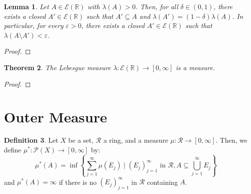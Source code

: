 \documentclass[a4paper, openany]{memoir}
\theoremstyle{definition}
\newtheorem{definition}{Definition}[section]
\theoremstyle{plain}
\newtheorem{theorem}[definition]{Theorem}
\newtheorem{lemma}[definition]{Lemma}
\begin{document}
    \begin{lemma}
        Let $A \in \mathcal{E}(\mathbb{R})$ with $\lambda(A) > 0$. Then, for all $\delta \in (0, 1)$, there exists a closed $A' \in \mathcal{E}(\mathbb{R})$ such that $A' \subseteq A$ and $\lambda(A') = (1 - \delta ) \lambda(A)$. In particular, for every $\varepsilon > 0$, there exists a closed $A' \in \mathcal{E}(\mathbb{R})$ such that $\lambda(A \setminus A') < \varepsilon$.
    \end{lemma}
    \begin{proof}
        
    \end{proof}

    \begin{theorem}
        The Lebesgue measure $\lambda \colon \mathcal{E}(\mathbb{R}) \to [0, \infty]$ is a measure.
    \end{theorem}
    \begin{proof}
        
    \end{proof}
    \newpage

    \section{Outer Measure}
    \begin{definition}
        Let $X$ be a set, $\mathcal{R}$ a ring, and a measure $\mu \colon \mathcal{R} \to [0, \infty]$. Then, we define $\mu^* \colon \mathcal{P}(X) \to [0, \infty]$ by:
        \[\mu^*(A) = \inf \left\{\sum_{j=1}^\infty \mu(E_j) \mid (E_j)_{j=1}^\infty \text{ in } \mathcal{R}, A \subseteq \bigcup_{j=1}^\infty E_j\right\}\]
        and $\mu^*(A) = \infty$ if there is no $(E_j)_{j=1}^\infty$ in $\mathcal{R}$ containing $A$.
    \end{definition}
\end{document}
